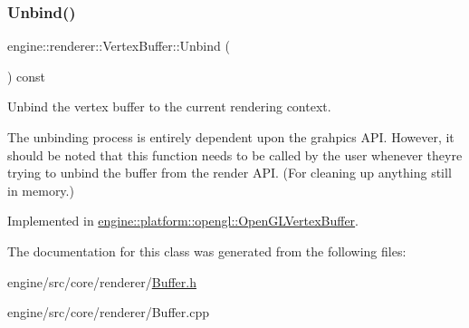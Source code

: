 \subsubsection{\texorpdfstring{Unbind()}{Unbind()}}
{\footnotesize\ttfamily engine\+::renderer\+::\+Vertex\+Buffer\+::\+Unbind (\begin{DoxyParamCaption}{ }\end{DoxyParamCaption}) const\hspace{0.3cm}{\ttfamily [pure virtual]}}



Unbind the vertex buffer to the current rendering context. 

The unbinding process is entirely dependent upon the grahpics A\+PI. However, it should be noted that this function needs to be called by the user whenever they\textquotesingle{}re trying to unbind the buffer from the render A\+PI. (For cleaning up anything still in memory.) 

Implemented in \hyperlink{classengine_1_1platform_1_1opengl_1_1OpenGLVertexBuffer_a9069ca746c0de9dd9418ba9c5ee7b67b}{engine\+::platform\+::opengl\+::\+Open\+G\+L\+Vertex\+Buffer}.



The documentation for this class was generated from the following files\+:\begin{DoxyCompactItemize}
\item 
engine/src/core/renderer/\hyperlink{Buffer_8h}{Buffer.\+h}\item 
engine/src/core/renderer/Buffer.\+cpp\end{DoxyCompactItemize}
